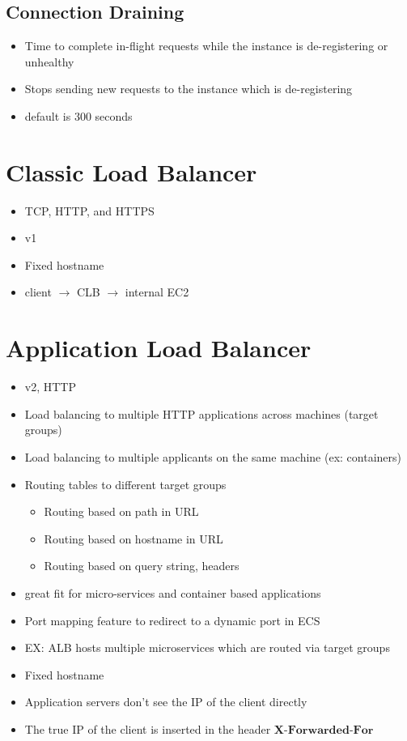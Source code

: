 \documentclass[]{scrartcl}
\begin{document}
\subsection{Connection Draining}
\begin{itemize}
	\item Time to complete in-flight requests while the instance is de-registering or unhealthy
	\item Stops sending new requests to the instance which is de-registering
	\item default is 300 seconds
\end{itemize}

\section{Classic Load Balancer}
\begin{itemize}
	\item TCP, HTTP, and HTTPS
	\item v1
	\item Fixed hostname
	\item client $\rightarrow$ CLB $\rightarrow$ internal EC2
\end{itemize}

\section{Application Load Balancer}
\begin{itemize}
	\item v2, HTTP
	\item Load balancing to multiple HTTP applications across machines (target groups)
	\item Load balancing to multiple applicants on the same machine (ex: containers)
	\item Routing tables to different target groups
	\begin{itemize}
		\item Routing based on path in URL
		\item Routing based on hostname in URL
		\item Routing based on query string, headers
	\end{itemize}
	\item great fit for micro-services and container based applications
	\item Port mapping feature to redirect to a dynamic port in ECS
	\item EX: ALB hosts multiple microservices which are routed via target groups
	\item Fixed hostname
	\item Application servers don't see the IP of the client directly
	\item The true IP of the client is inserted in the header $\textbf{X-Forwarded-For}$
\end{itemize}
\end{document}

